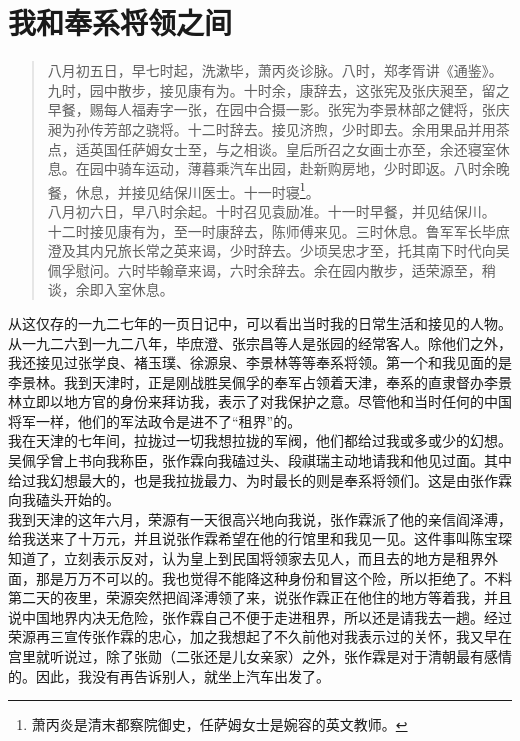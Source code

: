 \fancyhead[RO]{} %
\fancyhead[LE]{} %
\chapter*{我和奉系将领之间}
\thispagestyle{empty}
\begin{quote}
	八月初五日，早七时起，洗漱毕，萧丙炎诊脉。八时，郑孝胥讲《通鉴》。九时，园中散步，接见康有为。十时余，康辞去，这张宪及张庆昶至，留之早餐，赐每人福寿字一张，在园中合摄一影。张宪为李景林部之健将，张庆昶为孙传芳部之骁将。十二时辞去。接见济煦，少时即去。余用果品并用茶点，适英国任萨姆女士至，与之相谈。皇后所召之女画士亦至，余还寝室休息。在园中骑车运动，薄暮乘汽车出园，赴新购房地，少时即返。八时余晚餐，休息，并接见结保川医士。十一时寝\footnote{萧丙炎是清末都察院御史，任萨姆女士是婉容的英文教师。}。\\

八月初六日，早八时余起。十时召见袁励准。十一时早餐，并见结保川。\\

十二时接见康有为，至一时康辞去，陈师傅来见。三时休息。鲁军军长毕庶澄及其内兄旅长常之英来谒，少时辞去。少顷吴忠才至，托其南下时代向吴佩孚慰问。六时毕翰章来谒，六时余辞去。余在园内散步，适荣源至，稍谈，余即入室休息。\\
\end{quote}

从这仅存的一九二七年的一页日记中，可以看出当时我的日常生活和接见的人物。从一九二六到一九二八年，毕庶澄、张宗昌等人是张园的经常客人。除他们之外，我还接见过张学良、褚玉璞、徐源泉、李景林等等奉系将领。第一个和我见面的是李景林。我到天津时，正是刚战胜吴佩孚的奉军占领着天津，奉系的直隶督办李景林立即以地方官的身份来拜访我，表示了对我保护之意。尽管他和当时任何的中国将军一样，他们的军法政令是进不了“租界”的。\\

我在天津的七年间，拉拢过一切我想拉拢的军阀，他们都给过我或多或少的幻想。吴佩孚曾上书向我称臣，张作霖向我磕过头、段祺瑞主动地请我和他见过面。其中给过我幻想最大的，也是我拉拢最力、为时最长的则是奉系将领们。这是由张作霖向我磕头开始的。\\

我到天津的这年六月，荣源有一天很高兴地向我说，张作霖派了他的亲信阎泽溥，给我送来了十万元，并且说张作霖希望在他的行馆里和我见一见。这件事叫陈宝琛知道了，立刻表示反对，认为皇上到民国将领家去见人，而且去的地方是租界外面，那是万万不可以的。我也觉得不能降这种身份和冒这个险，所以拒绝了。不料第二天的夜里，荣源突然把阎泽溥领了来，说张作霖正在他住的地方等着我，并且说中国地界内决无危险，张作霖自己不便于走进租界，所以还是请我去一趟。经过荣源再三宣传张作霖的忠心，加之我想起了不久前他对我表示过的关怀，我又早在宫里就听说过，除了张勋（二张还是儿女亲家）之外，张作霖是对于清朝最有感情的。因此，我没有再告诉别人，就坐上汽车出发了。\\

